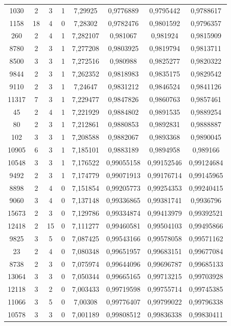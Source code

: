 \begin{longtable}{|c|c|c|c|c|c|c|c|}
1030 & 2 & 3 & 1 & 7,29925 & 0,9776889 & 0,9795442 & 0,9788617 \\
1158 & 18 & 4 & 0 & 7,28302 & 0,9782476 & 0,9801592 & 0,9796357 \\
260 & 2 & 4 & 1 & 7,282107 & 0,981067 & 0,981924 & 0,9815909 \\
8780 & 2 & 3 & 1 & 7,277208 & 0,9803925 & 0,9819794 & 0,9813711 \\
8500 & 3 & 3 & 1 & 7,272516 & 0,980988 & 0,9825277 & 0,9820322 \\
9844 & 2 & 3 & 1 & 7,262352 & 0,9818983 & 0,9835175 & 0,9829542 \\
9110 & 2 & 3 & 1 & 7,24647 & 0,9831212 & 0,9846524 & 0,9841126 \\
11317 & 7 & 3 & 1 & 7,229477 & 0,9847826 & 0,9860763 & 0,9857461 \\
45 & 2 & 4 & 1 & 7,221929 & 0,9884802 & 0,9891535 & 0,9889254 \\
80 & 2 & 3 & 1 & 7,212861 & 0,9880853 & 0,9892831 & 0,9888887 \\
102 & 3 & 3 & 1 & 7,208588 & 0,9882067 & 0,9893368 & 0,9890045 \\
10905 & 6 & 3 & 1 & 7,185101 & 0,9883189 & 0,9894958 & 0,989166 \\
10548 & 3 & 3 & 1 & 7,176522 & 0,99055158 & 0,99152546 & 0,99124684 \\
9492 & 2 & 3 & 1 & 7,174779 & 0,99071913 & 0,99176714 & 0,99145965 \\
8898 & 2 & 4 & 0 & 7,151854 & 0,99205773 & 0,99254353 & 0,99240415 \\
9060 & 3 & 4 & 0 & 7,137148 & 0,99336865 & 0,99381741 & 0,9936796 \\
15673 & 2 & 3 & 0 & 7,129786 & 0,99334874 & 0,99413979 & 0,99392521 \\
12418 & 2 & 15 & 0 & 7,111277 & 0,99460581 & 0,99504103 & 0,99495866 \\
9825 & 3 & 5 & 0 & 7,087425 & 0,99543166 & 0,99578058 & 0,99571162 \\
23 & 2 & 4 & 0 & 7,080348 & 0,99651957 & 0,99683151 & 0,99677084 \\
8738 & 2 & 3 & 0 & 7,075974 & 0,99644096 & 0,99696787 & 0,99685133 \\
13064 & 3 & 3 & 0 & 7,050344 & 0,99665165 & 0,99713215 & 0,99703928 \\
12118 & 3 & 2 & 0 & 7,003433 & 0,99719598 & 0,99755714 & 0,99745385 \\
11066 & 3 & 5 & 0 & 7,00308 & 0,99776407 & 0,99799022 & 0,99796338 \\
10578 & 3 & 3 & 0 & 7,001189 & 0,99808512 & 0,99836338 & 0,99830411 \\

\end{longtable}
